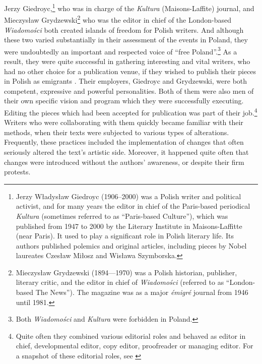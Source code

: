 \begin{paper}
Jerzy Giedroyc,\footnote{Jerzy Władysław Giedroyc (1906--2000) was a Polish
  writer and political activist, and for many years the editor in chief of the
  Paris-based periodical \emph{Kultura} (sometimes referred to as
  ``Paris-based Culture''), which was published from 1947 to 2000 by the Literary
  Institute in Maisons-Laffitte (near Paris). It used to play a
  significant role in Polish literary life. Its authors published 
  polemics and original articles, including pieces by Nobel laureates
  Czesław Miłosz and Wisława Szymborska.} who was in charge of the
\emph{Kultura} (Maisons-Laffite) journal, and Mieczysław
Grydzewski\footnote{Mieczysław Grydzewski (1894---1970) was a Polish historian,
  publisher, literary critic, and the editor in chief of \emph{Wiadomości}
  (referred to as ``London-based The News''). The magazine was as a
  major \textit{émigré} journal from 1946 until 1981.} who was the editor in chief of
the London-based \emph{Wiadomości} both created islands of freedom for Polish
writers. And although these two varied substantially in their assessment
of the events in Poland, they were undoubtedly an important and
respected voice of ``free Poland''.\footnote{Both \emph{Wiadomości }and
  \emph{Kultura }were forbidden in Poland.} As a result, they were
quite successful in gathering interesting and vital writers, who had no other choice for a publication venue, if they wished to publish their pieces in Polish as
emigrants \citep{borejsza_totalitarian_2006}. Their
employers, Giedroyc and Grydzewski, were both competent, expressive and
powerful personalities. Both of them were also men of their own specific
vision and program which they were successfully executing. Editing the
pieces which had been accepted for publication was part of their job.\footnote{Quite
  often they combined various editorial roles and behaved as
  editor in chief, developmental editor, copy editor, proofreader or
  managing editor. For a snapshot of these editorial roles, see \citealt[11]{greenberg_poetics_2018}}
Writers who were collaborating with them quickly became familiar with their methods, when their texts were subjected to various
types of alterations. Frequently, these practices included the implementation of changes that 
often seriously altered the text's artistic side. Moreover, it happened
quite often that changes were introduced without the authors' awareness, or
despite their firm protests.


\end{paper}
